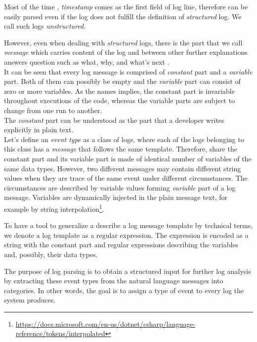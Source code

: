 Most of the time \cite{log4j:example} \cite{serilog:example} \cite{python_log:example}, \textit{timestamp} comes as the first field of log line, therefore can be easily parsed even if the log does not fulfill the definition of \textit{structured} log. We call such logs \textit{unstructured}.

However, even when dealing with \textit{structured} logs, there is the part that we call \textit{message} which carries content of the log and between other further explanations answers question such as what, why, and what's next \cite{structured_logging}.\\

It can be seen that every log message is comprised of \textit{constant} part and a \textit{variable} part. Both of them can possibly be empty and the \textit{variable} part can consist of zero or more variables.
As the names implies, the constant part is invariable throughout executions of the code, whereas the variable parts are subject to change from one run to another.\\
The \textit{constant} part can be understood as the part that a developer writes explicitly in plain text.\\

Let's define an \textit{event type} as a class of logs, where each of the logs belonging to this class has a \textit{message} that follows the same template. Therefore, share the constant part and its variable part is made of identical number of variables of the same data types.
However, two different messages may contain different string values when they are trace of the same event under different circumstances. The circumstances are described by variable values forming \textit{variable} part of a log message. Variables are dynamically injected in the plain message text, for example by string interpolation\footnote{\url{https://docs.microsoft.com/en-us/dotnet/csharp/language-reference/tokens/interpolated}}.

To have a tool to generalize a describe a log message template by technical terms, we denote a log template as a regular expression. The expression is encoded as a string with the constant part and regular expressions describing the variables and, possibly, their data types.

The purpose of log parsing is to obtain a structured input for further log analysis by extracting these event types from the natural language messages into categories.
In other words, the goal is to assign a type of event to every log the system produces.\\

